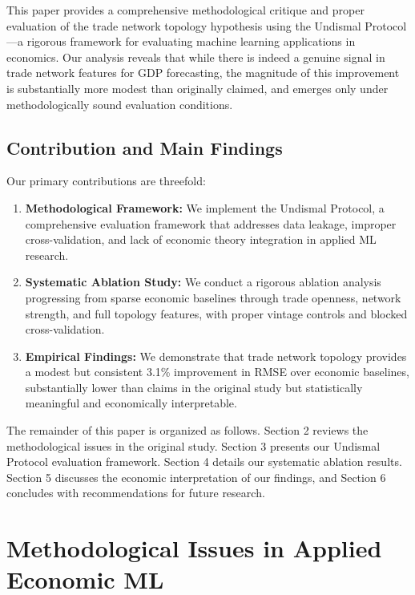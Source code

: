 \documentclass[11pt,a4paper]{article}
\begin{document}
This paper provides a comprehensive methodological critique and proper evaluation of the trade network topology hypothesis using the Undismal Protocol—a rigorous framework for evaluating machine learning applications in economics. Our analysis reveals that while there is indeed a genuine signal in trade network features for GDP forecasting, the magnitude of this improvement is substantially more modest than originally claimed, and emerges only under methodologically sound evaluation conditions.

\subsection{Contribution and Main Findings}

Our primary contributions are threefold:

\begin{enumerate}
\item \textbf{Methodological Framework:} We implement the Undismal Protocol, a comprehensive evaluation framework that addresses data leakage, improper cross-validation, and lack of economic theory integration in applied ML research.

\item \textbf{Systematic Ablation Study:} We conduct a rigorous ablation analysis progressing from sparse economic baselines through trade openness, network strength, and full topology features, with proper vintage controls and blocked cross-validation.

\item \textbf{Empirical Findings:} We demonstrate that trade network topology provides a modest but consistent 3.1\% improvement in RMSE over economic baselines, substantially lower than claims in the original study but statistically meaningful and economically interpretable.
\end{enumerate}

The remainder of this paper is organized as follows. Section 2 reviews the methodological issues in the original study. Section 3 presents our Undismal Protocol evaluation framework. Section 4 details our systematic ablation results. Section 5 discusses the economic interpretation of our findings, and Section 6 concludes with recommendations for future research.

\section{Methodological Issues in Applied Economic ML}
\end{document}

